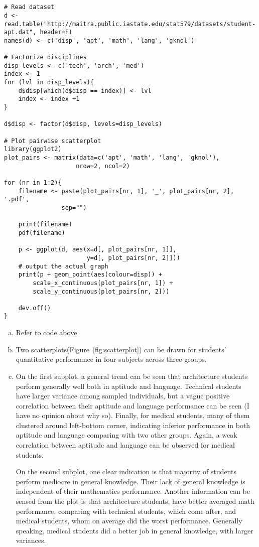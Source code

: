 \documentclass[letter]{article}
\begin{document}
    \section{}
    \begin{verbatim}
# Read dataset
d <- read.table("http://maitra.public.iastate.edu/stat579/datasets/student-apt.dat", header=F)
names(d) <- c('disp', 'apt', 'math', 'lang', 'gknol')

# Factorize disciplines 
disp_levels <- c('tech', 'arch', 'med')
index <- 1
for (lvl in disp_levels){
    d$disp[which(d$disp == index)] <- lvl
    index <- index +1
}

d$disp <- factor(d$disp, levels=disp_levels)

# Plot pairwise scatterplot 
library(ggplot2)
plot_pairs <- matrix(data=c('apt', 'math', 'lang', 'gknol'), 
                    nrow=2, ncol=2)

for (nr in 1:2){
    filename <- paste(plot_pairs[nr, 1], '_', plot_pairs[nr, 2], '.pdf',
                sep="")

    print(filename)
    pdf(filename)

    p <- ggplot(d, aes(x=d[, plot_pairs[nr, 1]],
                       y=d[, plot_pairs[nr, 2]]))
    # output the actual graph
    print(p + geom_point(aes(colour=disp)) + 
        scale_x_continuous(plot_pairs[nr, 1]) + 
        scale_y_continuous(plot_pairs[nr, 2]))

    dev.off()
}
    \end{verbatim}
    \begin{enumerate}[(a)]
        \item Refer to code above
        \item Two scatterplots(Figure~\ref{fig:scatterplot}) can be drawn for students' quantitative
        performance in four subjects across three groups.
        \item 
        On the first subplot, a general trend can be seen that architecture
        students perform generally well both in aptitude and language.
        Technical students have larger variance among sampled individuals, but
        a vague positive correlation between their aptitude and language
        performance can be seen (I have no opinion about why so). Finally, for
        medical students, many of them clustered around left-bottom corner,
        indicating inferior performance in both aptitude and language comparing
        with two other groups. Again, a weak correlation between aptitude and
        language can be observed for medical students.

        On the second subplot, one clear indication is that majority of
        students perform mediocre in general knowledge. Their lack of general
        knowledge is independent of their mathematics performance. Another
        information can be sensed from the plot is that architecture students,
        have better averaged math performance, comparing with technical
        students, which come after, and medical students, whom on average did
        the worst performance. Generally speaking, medical students did a
        better job in general knowledge, with larger variances.
    \end{enumerate}
\end{document}
